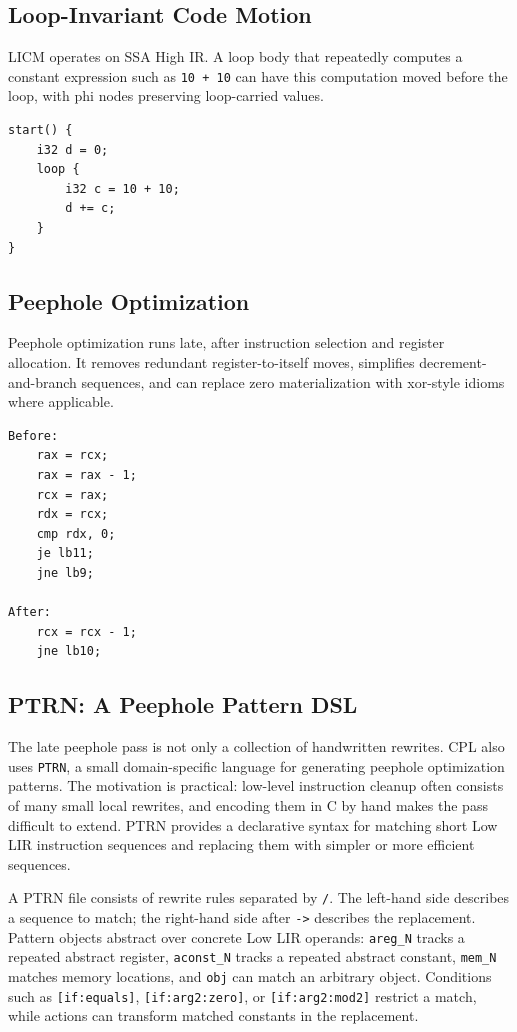 \documentclass[10pt,twocolumn]{article}
\begin{document}
\subsection{Loop-Invariant Code Motion}

\par LICM operates on SSA High IR. A loop body that repeatedly computes a constant expression such as \texttt{10 + 10} can have this computation moved before the loop, with phi nodes preserving loop-carried values.

\begin{lstlisting}[language=CPL,caption={LICM source pattern.}]
start() {
    i32 d = 0;
    loop {
        i32 c = 10 + 10;
        d += c;
    }
}
\end{lstlisting}

\subsection{Peephole Optimization}

\par Peephole optimization runs late, after instruction selection and register allocation. It removes redundant register-to-itself moves, simplifies decrement-and-branch sequences, and can replace zero materialization with xor-style idioms where applicable.

\begin{lstlisting}[caption={Peephole effect on a counted empty loop.}]
Before:
    rax = rcx;
    rax = rax - 1;
    rcx = rax;
    rdx = rcx;
    cmp rdx, 0;
    je lb11;
    jne lb9;

After:
    rcx = rcx - 1;
    jne lb10;
\end{lstlisting}


\subsection{PTRN: A Peephole Pattern DSL}

\par The late peephole pass is not only a collection of handwritten rewrites. CPL also uses \texttt{PTRN}, a small domain-specific language for generating peephole optimization patterns. The motivation is practical: low-level instruction cleanup often consists of many small local rewrites, and encoding them in C by hand makes the pass difficult to extend. PTRN provides a declarative syntax for matching short Low LIR instruction sequences and replacing them with simpler or more efficient sequences.
\par A PTRN file consists of rewrite rules separated by \texttt{/}. The left-hand side describes a sequence to match; the right-hand side after \texttt{->} describes the replacement. Pattern objects abstract over concrete Low LIR operands: \texttt{areg\_N} tracks a repeated abstract register, \texttt{aconst\_N} tracks a repeated abstract constant, \texttt{mem\_N} matches memory locations, and \texttt{obj} can match an arbitrary object. Conditions such as \texttt{[if:equals]}, \texttt{[if:arg2:zero]}, or \texttt{[if:arg2:mod2]} restrict a match, while actions can transform matched constants in the replacement.
\end{document}
